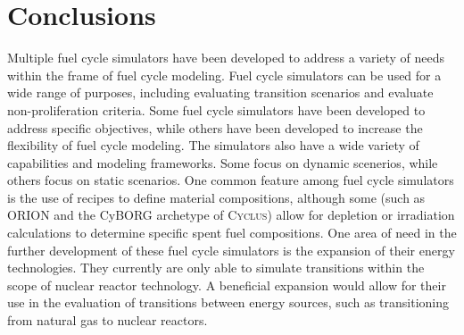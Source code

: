 \documentclass{article}
\newcommand{\Cyclus}{\textsc{Cyclus}\xspace}%
\begin{document}
    

\section{Conclusions}
    Multiple fuel cycle simulators have been developed to address a variety 
    of needs within the frame of fuel cycle modeling. Fuel cycle simulators 
    can be used for a wide range of purposes, including evaluating transition
    scenarios and evaluate non-proliferation criteria. Some fuel cycle 
    simulators have been developed to address specific objectives, while others 
    have been developed to increase the flexibility of fuel cycle modeling.
    The simulators also have a wide variety of capabilities and modeling frameworks.
    Some focus on dynamic scenerios, while others focus on static scenarios. 
    One common feature among fuel cycle simulators is the use of recipes to 
    define material compositions, although some (such as ORION and the CyBORG 
    archetype of \Cyclus) allow for depletion or irradiation calculations 
    to determine specific spent fuel compositions. One area of need in the 
    further development of these fuel cycle simulators is the expansion of their 
    energy technologies. They currently are only able to simulate transitions 
    within the scope of nuclear reactor technology. A beneficial expansion 
    would allow for their use in the evaluation of transitions between energy 
    sources, such as transitioning from natural gas to nuclear reactors. 
% 

   
\end{document}
